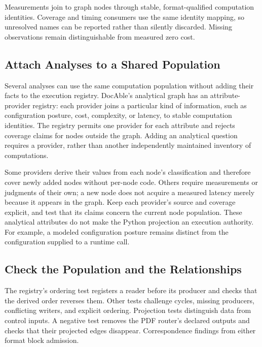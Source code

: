 Measurements join to graph nodes through stable, format-qualified computation identities. Coverage and timing consumers use the same identity mapping, so unresolved names can be reported rather than silently discarded. Missing observations remain distinguishable from measured zero cost.

\subsection*{Attach Analyses to a Shared Population}

Several analyses can use the same computation population without adding their facts to the execution registry. DocAble's analytical graph has an attribute-provider registry: each provider joins a particular kind of information, such as configuration posture, cost, complexity, or latency, to stable computation identities. The registry permits one provider for each attribute and rejects coverage claims for nodes outside the graph. Adding an analytical question requires a provider, rather than another independently maintained inventory of computations.

Some providers derive their values from each node's classification and therefore cover newly added nodes without per-node code. Others require measurements or judgments of their own; a new node does not acquire a measured latency merely because it appears in the graph. Keep each provider's source and coverage explicit, and test that its claims concern the current node population. These analytical attributes do not make the Python projection an execution authority. For example, a modeled configuration posture remains distinct from the configuration supplied to a runtime call.

\subsection*{Check the Population and the Relationships}

The registry's ordering test registers a reader before its producer and checks that the derived order reverses them. Other tests challenge cycles, missing producers, conflicting writers, and explicit ordering. Projection tests distinguish data from control inputs. A negative test removes the PDF router's declared outputs and checks that their projected edges disappear. Correspondence findings from either format block admission.

